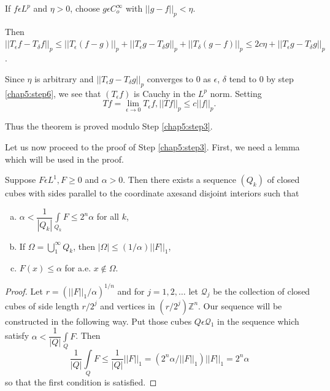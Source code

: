 \begin{step} \label{chap5:step7}%
  If $f \epsilon L^p$ and $\eta > 0$, choose $g \epsilon
  C^{\infty}_{o}$ with $|| g - f ||_p < \eta$. 
\end{step}


Then $|| T_{\epsilon} f - T_{\delta} f ||_p \le || T_{\epsilon}
(f-g)||_p + || T_{\epsilon} g - T_\delta g ||_p + ||T_\delta (g-f)
||_p \le 2c \eta + || T_{\epsilon}g - T_\delta g ||_p$. 


Since $\eta$ is arbitrary and $|| T_{\epsilon} g - T_\delta g ||_p$
converges to $0$ as $\epsilon$, $\delta$ tend to $0$ by
step \ref{chap5:step6},
we see that $(T_{\epsilon} f)$ is Cauchy in the $L^p$ norm. Setting 
$$
Tf = \lim_{\epsilon \to 0} T_{\epsilon} f, || Tf ||_p \le c || f ||_p.
$$

Thus the theorem is proved modulo Step \ref{chap5:step3}.

Let us now proceed to the proof of Step
\ref{chap5:step3}. First, we need a lemma which will be used in
the proof.  

\setcounter{lem}{16}
\begin{lem} \label{chap5:lem5.17}%
  Suppose  $F \epsilon L^1, F \ge 0$ and $\alpha >
  0$. Then there exists a sequence  $(Q_k)$ of closed cubes
  with sides parallel to the coordinate axes\pageoriginale and disjoint interiors
  such that 
  \begin{enumerate}[a)]
  \item $\alpha < \dfrac{1}{| Q_k |} \int\limits_{Q_k} F \le 2^n \alpha$
    for all  $k$, 
  \item If $\Omega = \bigcup\limits_{1}^{\infty} Q_k$, then $| \Omega |
    \le (1/\alpha) || F ||_1$, 
  \item $F(x) \le \alpha$ for a.e. $x \notin \Omega$. 
  \end{enumerate}
\end{lem}

\begin{proof} %
  Let $r = ( || F ||_1 / \alpha)^{1/n}$ and for $j = 1, 2, \ldots$ let
  $\mathscr{Q}_j$ be the collection of closed cubes of side length
  $r/2^j$ and vertices in $(r/2^j) \mathbb{Z}^n$. Our sequence will be
  constructed in the following way. Put those cubes $Q \epsilon
  \mathscr{Q}_1$ in the sequence which satisfy $\alpha < \dfrac{1}{| Q
    |} \int\limits_{Q} F$. Then 
  $$
  \frac{1}{|Q|} \int\limits_{Q} F \le \frac{1}{| Q |} || F ||_1 = (2^n
  \alpha/ || F ||_1) || F ||_1 = 2^n \alpha 
  $$
  so that the first condition is satisfied.
\end{proof}

